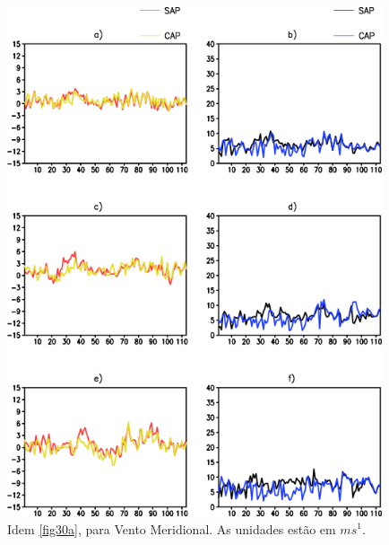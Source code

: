 \begin{figure}[!h]
\centering
\includegraphics[height=15cm]{./figs/vies_eqm-vvel.png}
\caption{Idem \autoref{fig30a}, para Vento Meridional. As unidades estão em $ms^{1}$.}
\label{fig33a}
\end{figure}

\break

